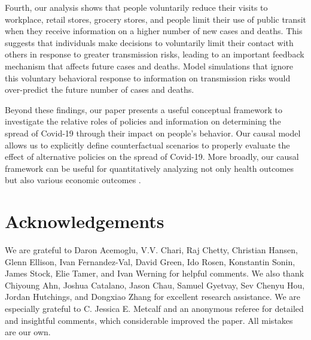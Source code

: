 \documentclass[3p, longtitle]{elsarticle}
\theoremstyle{definition}
\begin{document}
Fourth, our analysis shows that people voluntarily reduce their visits to workplace, retail stores, grocery stores, and people limit their use of public transit when they receive  information on a higher number of new cases and deaths. This suggests that individuals make decisions to voluntarily limit their contact with others in response to greater transmission risks, leading to an important feedback mechanism that affects future cases and deaths. Model simulations that ignore this voluntary behavioral response to information on transmission risks would over-predict the future number of cases and deaths.

Beyond these findings, our paper presents a useful conceptual framework to investigate the relative roles of policies and information on determining the spread of Covid-19 through their impact on people's behavior. Our causal model allows us  to explicitly define counterfactual scenarios to properly evaluate the effect of alternative policies on the spread of Covid-19. %
 More broadly, our  causal framework can be useful for quantitatively analyzing not only health outcomes but also various economic outcomes \citep{bartik2020, chetty2020real}.





\FloatBarrier

\section*{Acknowledgements}

We are grateful to Daron Acemoglu, V.V. Chari, Raj Chetty, Christian
Hansen, Glenn Ellison, Ivan Fernandez-Val, David Green, Ido Rosen,
Konstantin Sonin, James Stock, Elie Tamer, and Ivan Werning for
helpful comments. We also thank Chiyoung Ahn, Joshua Catalano, Jason
Chau, Samuel Gyetvay, Sev Chenyu Hou, Jordan Hutchings, and Dongxiao
Zhang for excellent research assistance.  We are especially grateful
to C. Jessica E. Metcalf and an anonymous referee for detailed and
insightful comments, which considerable improved the paper. All
mistakes are our own.

\begin{footnotesize}




\end{footnotesize}
\end{document}
